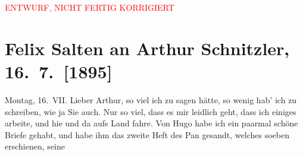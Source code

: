
\begin{center}
            \textcolor{red}{ENTWURF, NICHT FERTIG KORRIGIERT}
                      \end{center}
            
         
         \renewcommand{\erwaehntePersonen}{Personen: Richard Beer-Hofmann, Hugo von Hofmannsthal, Charlotte Pohl-Glas}
         \renewcommand{\erwaehnteOrte}{Orte: Bad Ischl, Kopenhagen, Wien}
         \renewcommand{\erwaehnteWerke}{Werke: Pan, Quer durch den Wurstelprater, Terzinen}
               \section[Felix Salten an Arthur Schnitzler, 16. 7. {[}1895{]}]{ Felix Salten an Arthur Schnitzler, 16. 7. {[}1895{]}}\nopagebreak{}\rehead{ }\begin{ledgroupsized}[t]{13cm}\normalsize\beginnumbering \toendnotes[C]{\smallbreak\pagebreak[2]} 
\toendnotes[C]{\smallbreak}\pstart
           \raggedleft{}{\pb}Montag, 16. VII.\pend
           \pstart
           Lieber Arthur, so viel ich zu sagen hätte, so wenig hab' ich zu
               schreiben, wie ja Sie auch. Nur so viel, dass es mir leidlich geht, dass ich einiges
               arbeite, und hie und da aufs Land fahre. Von Hugo habe ich ein paarmal schöne Briefe gehabt, und habe ihm das zweite Heft
               des Pan gesandt, welches soeben {\pb}erschienen, seine \label{K_L03158-1v}
\end{ledgroupsized}
